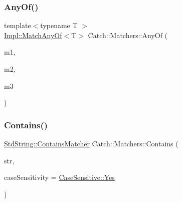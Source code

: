 \mbox{\label{namespace_catch_1_1_matchers_a37055a4e76b2aa356b17a508a806a445}} 
\subsubsection{\texorpdfstring{Any\+Of()}{AnyOf()}\hspace{0.1cm}{\footnotesize\ttfamily [2/2]}}
{\footnotesize\ttfamily template$<$typename T $>$ \\
\hyperlink{struct_catch_1_1_matchers_1_1_impl_1_1_match_any_of}{Impl\+::\+Match\+Any\+Of}$<$T$>$ Catch\+::\+Matchers\+::\+Any\+Of (\begin{DoxyParamCaption}\item[{\hyperlink{struct_catch_1_1_matchers_1_1_impl_1_1_matcher_base}{Impl\+::\+Matcher\+Base}$<$ T $>$ const \&}]{m1,  }\item[{\hyperlink{struct_catch_1_1_matchers_1_1_impl_1_1_matcher_base}{Impl\+::\+Matcher\+Base}$<$ T $>$ const \&}]{m2,  }\item[{\hyperlink{struct_catch_1_1_matchers_1_1_impl_1_1_matcher_base}{Impl\+::\+Matcher\+Base}$<$ T $>$ const \&}]{m3 }\end{DoxyParamCaption})\hspace{0.3cm}{\ttfamily [inline]}}

\mbox{\label{namespace_catch_1_1_matchers_a1f6c2accdc6cd75a84d7112dcad647b4}} 
\subsubsection{\texorpdfstring{Contains()}{Contains()}\hspace{0.1cm}{\footnotesize\ttfamily [1/2]}}
{\footnotesize\ttfamily \hyperlink{struct_catch_1_1_matchers_1_1_std_string_1_1_contains_matcher}{Std\+String\+::\+Contains\+Matcher} Catch\+::\+Matchers\+::\+Contains (\begin{DoxyParamCaption}\item[{\textbf{ std\+::string} const \&}]{str,  }\item[{\hyperlink{struct_catch_1_1_case_sensitive_aad49d3aee2d97066642fffa919685c6a}{Case\+Sensitive\+::\+Choice}}]{case\+Sensitivity = {\ttfamily \hyperlink{struct_catch_1_1_case_sensitive_aad49d3aee2d97066642fffa919685c6aa7c5550b69ec3c502e6f609b67f9613c6}{Case\+Sensitive\+::\+Yes}} }\end{DoxyParamCaption})}

